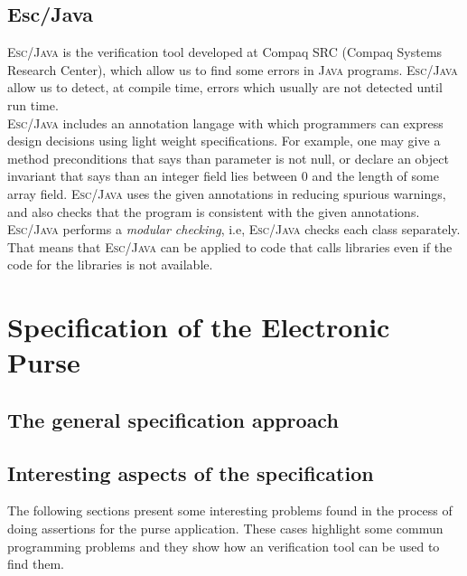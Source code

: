 \documentclass[a4paper]{llncs}
\begin{document}
\subsection{\sc Esc/Java}
\label{SubSectEscJava}
\textsc{Esc/Java} is the verification tool developed at
Compaq SRC (Compaq Systems Research Center), which allow us to find
some errors in \textsc{Java} programs. \textsc{Esc/Java} allow us to
detect, at compile time, errors which usually are not detected until
run time. \\

\textsc{Esc/Java} includes an annotation langage with which
programmers can express design decisions using light weight
specifications. For example, one may give a method preconditions that
says than parameter is not null, or declare an object invariant that
says than an integer field lies between $0$ and the length of some
array field. \textsc{Esc/Java} uses the given annotations in reducing
spurious warnings, and also checks that the program is consistent with 
the given annotations. \\

\textsc{Esc/Java} performs a \textit{modular checking}, i.e,
\textsc{Esc/Java} checks each class separately. That means that
\textsc{Esc/Java} can be applied to code that calls libraries even if
the code for the libraries is not available. 






\section{Specification of the Electronic Purse}
\label{SectSpecPurse}






\subsection{The general specification approach}






\subsection{Interesting aspects of the specification}
The following sections present some interesting problems found in the
process of doing assertions for the purse application. These cases
highlight some commun programming problems and they show how an
verification tool can be used to find them. 
\end{document}
